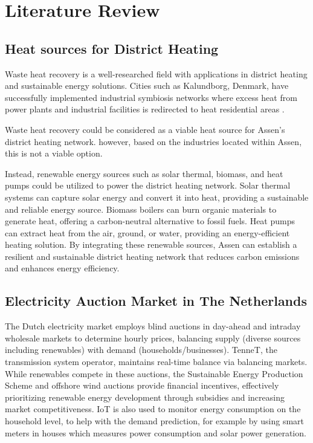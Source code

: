 \documentclass[conference]{IEEEtran}
\begin{document}
\section{Literature Review}
\subsection{Heat sources for District Heating}
Waste heat recovery is a well-researched field with applications in district heating and sustainable energy solutions. Cities such as Kalundborg, Denmark, have successfully implemented industrial symbiosis networks where excess heat from power plants and industrial facilities is redirected to heat residential areas \cite{kalundborg}.

Waste heat recovery could be considered as a viable heat source for Assen's district heating network. however, based on the industries located within Assen\cite{bedrijvenopdekaart_assen}, this is not a viable option.

Instead, renewable energy sources such as solar thermal, biomass, and heat pumps could be utilized to power the district heating network\cite{nationaal_programma_duurzame}. Solar thermal systems can capture solar energy and convert it into heat, providing a sustainable and reliable energy source. Biomass boilers can burn organic materials to generate heat, offering a carbon-neutral alternative to fossil fuels. Heat pumps can extract heat from the air, ground, or water, providing an energy-efficient heating solution. By integrating these renewable sources, Assen can establish a resilient and sustainable district heating network that reduces carbon emissions and enhances energy efficiency.

\subsection{Electricity Auction Market in The Netherlands}
The Dutch electricity market employs blind auctions in day-ahead and intraday wholesale markets to determine hourly prices, balancing supply (diverse sources including renewables) with demand (households/businesses). TenneT, the transmission system operator, maintains real-time balance via balancing markets\cite{tennetmarketfacilitation}. While renewables compete in these auctions, the Sustainable Energy
Production Scheme and offshore wind auctions provide financial incentives\cite{dutchoffshorewind}, effectively prioritizing renewable energy development through subsidies and increasing market competitiveness. IoT is also used to monitor energy consumption on the household level, to help with the demand prediction\cite{cbs2022slimmeapparaten}, for example by using smart meters in houses which measures power consumption and solar power generation. 
\end{document}
